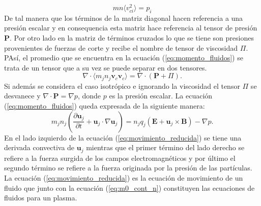 \documentclass[../tesis_main_file.tex]{subfiles}
\begin{document}
\begin{equation}
mn \langle v_{ci}^2\rangle = p_i
\end{equation} 
De tal manera que los términos de la matriz diagonal hacen referencia a una presión escalar y en consequencia esta matriz hace referencia al tensor de presión $\textbf{P}$.
Por otro lado en la matriz de términos cruzados lo que se tiene son presiones provenientes de fuerzas de corte \cite{bittencourt2013fundamentals} y recibe el nombre de tensor de viscosidad \textbf{$\Pi$}. PAsí, el promedio que se encuentra en la ecuación (\ref{eq:momento_fluidos}) se trata de un tensor que a su vez se puede separar en dos tensores.
\begin{equation}
\label{eq:tensor_p_vis}
\nabla \cdot \langle m_jn_j \textbf{v}_c \textbf{v}_c \rangle= \nabla \cdot (\textbf{P}+ \Pi).
\end{equation}
Si además se considera el caso isotrópico e ignorando la viscosidad el tensor $\Pi$ se desvanece y $\nabla \cdot \textbf{P}=\nabla p$, donde $p$ es la presión escalar. La ecuación (\ref{eq:momento_fluidos}) queda expresada de la siguiente manera:
\begin{equation}
\label{eq:movimiento_reducida}
m_jn_j \left( \frac{\partial \textbf{u}_j}{\partial t}+\textbf{u}_j\cdot \nabla \textbf{u}_j \right)= n_jq_j(\textbf{E}+\textbf{u}_j\times \textbf{B})- \nabla p.
\end{equation}
En el lado izquierdo de la ecuación (\ref{eq:movimiento_reducida}) se tiene una derivada convectiva de $\textbf{u}_j$ mientras que el primer término del lado derecho se refiere a la fuerza surgida de los campos electromagnéticos y por último el segundo término se refiere a la fuerza originada por la presión de las partículas.
La ecuación (\ref{eq:movimiento_reducida}) es la ecuación de movimiento de un fluido que junto con la ecuación (\ref{eq:m0_cont_n}) constituyen las ecuaciones de fluidos para un plasma.
\end{document}
